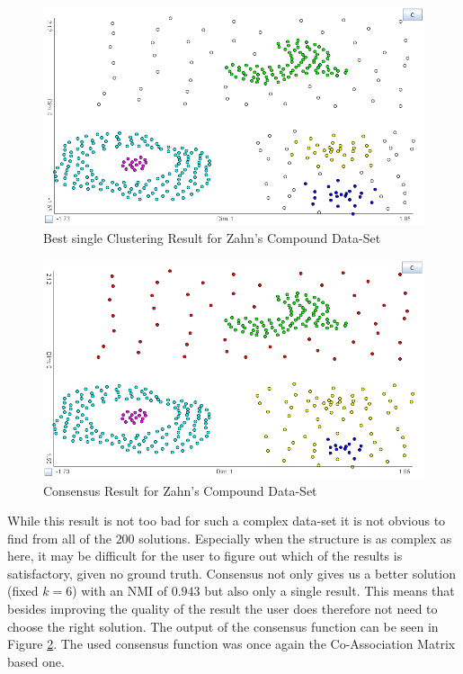 \documentclass[
	a4paper,
	english,
	twoside,
	openright,               
	11pt                            
	]{report}
\begin{document}
\begin{figure}[h]
	\centering
	\includegraphics[scale=.4]{zahn_best}
	\caption{Best single Clustering Result for Zahn's Compound Data-Set}
	\label{fig:zahn_best}
\end{figure}
\begin{figure}[h]
	\centering
	\includegraphics[scale=.4]{zahn_consensus}
	\caption{Consensus Result for Zahn's Compound Data-Set}
	\label{fig:zahn_consensus}
\end{figure}

While this result is not too bad for such a complex data-set it is not obvious to find from all of the $200$ solutions. Especially when the structure is as complex as here, it may be difficult for the user to figure out which of the results is satisfactory, given no ground truth. Consensus not only gives us a better solution (fixed $k=6$) with an NMI of $0.943$ but also only a single result. This means that besides improving the quality of the result the user does therefore not need to choose the right solution. The output of the consensus function can be seen in Figure \ref{fig:zahn_consensus}. The used consensus function was once again the  Co-Association Matrix based one.
\end{document}
